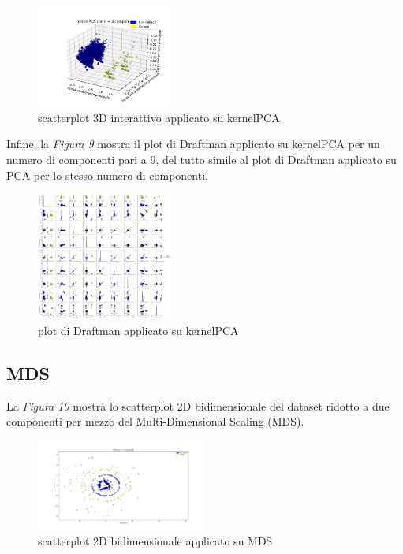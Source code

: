 \documentclass[11pt,a4paper,twocolumn]{article}
\begin{document}
	\begin{figure}[H]
		\centering
		\includegraphics[width=0.4\textwidth]{img/kernelPCA_i3D.png}
		\caption{scatterplot 3D interattivo applicato su kernelPCA}
	\end{figure}

	Infine, la \emph{Figura 9} mostra il plot di Draftman applicato su kernelPCA per un numero di componenti pari a 9, del tutto simile al plot di Draftman applicato su PCA per lo stesso numero di componenti.

	\begin{figure}[h]
		\centering
		\includegraphics[width=0.4\textwidth]{img/kernelPCA_SPLOM.png}
		\caption{plot di Draftman applicato su kernelPCA}
	\end{figure}
	
	\subsection{MDS}

	La \emph{Figura 10} mostra lo scatterplot 2D bidimensionale del dataset ridotto a due componenti per mezzo del Multi-Dimensional Scaling (MDS).

	\begin{figure}[H]
		\centering
		\includegraphics[width=0.5\textwidth]{img/MDS_2Dnc2.png}
		\caption{scatterplot 2D bidimensionale applicato su MDS}
	\end{figure}
	
\end{document}
